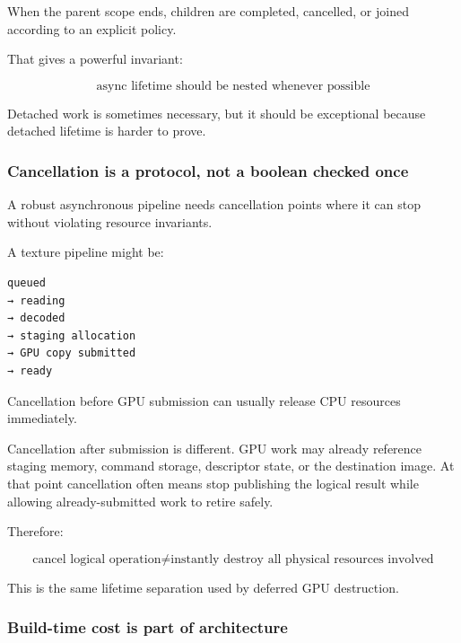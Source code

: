 When the parent scope ends, children are completed, cancelled, or joined according to an explicit policy.

That gives a powerful invariant:

\[
\boxed{
\text{async lifetime should be nested whenever possible}
}
\]

Detached work is sometimes necessary, but it should be exceptional because detached lifetime is harder to prove.

\subsubsection{Cancellation is a protocol, not a boolean checked once}\label{01-foundations-i-ch005-cancellation-is-a-protocol-not-a-boolean-checked-once}

\hypertarget{01-foundations-i-ch005-cancellation-is-a-protocol-not-a-boolean-checked-once}{}

A robust asynchronous pipeline needs cancellation points where it can stop without violating resource invariants.

A texture pipeline might be:

\begin{verbatim}
queued
→ reading
→ decoded
→ staging allocation
→ GPU copy submitted
→ ready
\end{verbatim}

Cancellation before GPU submission can usually release CPU resources immediately.

Cancellation after submission is different. GPU work may already reference staging memory, command storage, descriptor state, or the destination image. At that point cancellation often means stop publishing the logical result while allowing already-submitted work to retire safely.

Therefore:

\[
\boxed{
\text{cancel logical operation}
\neq
\text{instantly destroy all physical resources involved}
}
\]

This is the same lifetime separation used by deferred GPU destruction.

\subsubsection{Build-time cost is part of architecture}\label{01-foundations-i-ch005-build-time-cost-is-part-of-architecture}

\hypertarget{01-foundations-i-ch005-build-time-cost-is-part-of-architecture}{}

